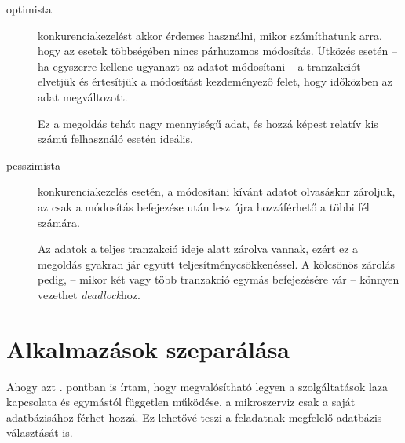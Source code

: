 \begin{description}
	\item[optimista] konkurenciakezelést akkor érdemes használni, mikor számíthatunk arra, hogy az esetek többségében nincs párhuzamos módosítás. Ütközés esetén --  ha egyszerre kellene ugyanazt az adatot módosítani --   a tranzakciót elvetjük és értesítjük a módosítást kezdeményező felet, hogy időközben  az adat megváltozott.
	
	Ez a megoldás tehát nagy mennyiségű adat, és hozzá képest relatív kis számú felhasználó esetén ideális.
	
	\item[pesszimista] konkurenciakezelés esetén, a módosítani kívánt adatot olvasáskor zároljuk, az csak a módosítás befejezése után lesz újra hozzáférhető a többi fél számára.
	
	Az adatok a teljes tranzakció ideje alatt zárolva vannak, ezért ez a megoldás gyakran jár együtt teljesítménycsökkenéssel. A kölcsönös zárolás pedig, --  mikor két vagy több tranzakció egymás befejezésére vár --   könnyen vezethet \textit{deadlock}hoz.
\end{description}


\section{Alkalmazások szeparálása}\label{sec:alkalmazasok_szeparalasa}
Ahogy azt . pontban is írtam, hogy megvalósítható legyen a szolgáltatások laza kapcsolata és egymástól független működése, a mikroszerviz csak a saját adatbázisához férhet hozzá. Ez lehetővé teszi a feladatnak megfelelő adatbázis választását is.

